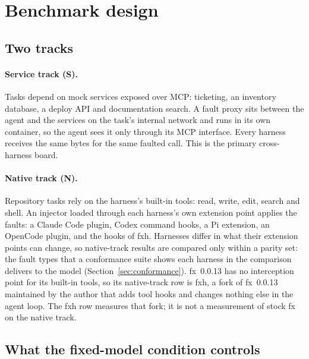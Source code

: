 \section{Benchmark design}
\label{sec:design}

\subsection{Two tracks}

\paragraph{Service track (S).}
Tasks depend on mock services exposed over MCP: ticketing, an inventory database, a deploy API and documentation search.
A fault proxy sits between the agent and the services on the task's internal network and runs in its own container, so the agent sees it only through its MCP interface.
Every harness receives the same bytes for the same faulted call.
This is the primary cross-harness board.

\paragraph{Native track (N).}
Repository tasks rely on the harness's built-in tools: read, write, edit, search and shell.
An injector loaded through each harness's own extension point applies the faults: a Claude Code plugin, Codex command hooks, a Pi extension, an OpenCode plugin, and the hooks of fxh.
Harnesses differ in what their extension points can change, so native-track results are compared only within a parity set: the fault types that a conformance suite shows each harness in the comparison delivers to the model (Section~\ref{sec:conformance}).
fx~0.0.13 has no interception point for its built-in tools, so its native-track row is fxh, a fork of fx~0.0.13 maintained by the author that adds tool hooks and changes nothing else in the agent loop.
The fxh row measures that fork; it is not a measurement of stock fx on the native track.

\subsection{What the fixed-model condition controls}
\label{sec:fixed}

